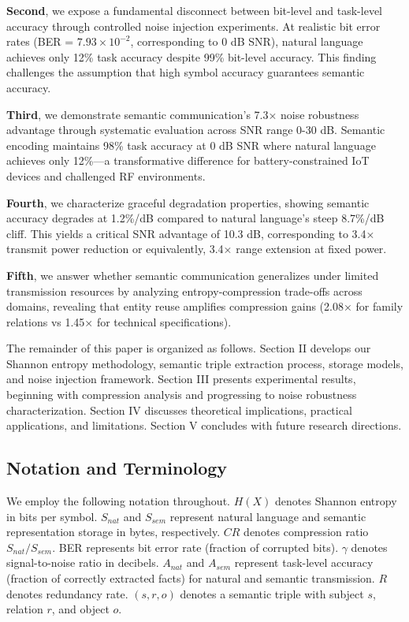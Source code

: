 \documentclass[conference]{IEEEtran}
\begin{document}
\textbf{Second}, we expose a fundamental disconnect between bit-level 
and task-level accuracy through controlled noise injection experiments. 
At realistic bit error rates (BER = $7.93 \times 10^{-2}$, corresponding 
to 0 dB SNR), natural language achieves only 12\% task accuracy despite 
99\% bit-level accuracy. This finding challenges the assumption that 
high symbol accuracy guarantees semantic accuracy.

\textbf{Third}, we demonstrate semantic communication's 7.3× noise 
robustness advantage through systematic evaluation across SNR range 
0-30 dB. Semantic encoding maintains 98\% task accuracy at 0 dB SNR 
where natural language achieves only 12\%—a transformative difference 
for battery-constrained IoT devices and challenged RF environments.

\textbf{Fourth}, we characterize graceful degradation properties, showing 
semantic accuracy degrades at 1.2\%/dB compared to natural language's 
steep 8.7\%/dB cliff. This yields a critical SNR advantage of 10.3 dB, 
corresponding to 3.4× transmit power reduction or equivalently, 3.4× 
range extension at fixed power.

\textbf{Fifth}, we answer whether semantic communication generalizes 
under limited transmission resources by analyzing entropy-compression 
trade-offs across domains, revealing that entity reuse amplifies compression 
gains (2.08× for family relations vs 1.45× for technical specifications).

The remainder of this paper is organized as follows. Section II develops 
our Shannon entropy methodology, semantic triple extraction process, 
storage models, and noise injection framework. Section III presents 
experimental results, beginning with compression analysis and progressing 
to noise robustness characterization. Section IV discusses theoretical 
implications, practical applications, and limitations. Section V concludes 
with future research directions.

\subsection{Notation and Terminology}

We employ the following notation throughout. $H(X)$ denotes Shannon 
entropy in bits per symbol. $S_{nat}$ and $S_{sem}$ represent natural 
language and semantic representation storage in bytes, respectively. 
$CR$ denotes compression ratio $S_{nat}/S_{sem}$. BER represents bit 
error rate (fraction of corrupted bits). $\gamma$ denotes signal-to-noise 
ratio in decibels. $A_{nat}$ and $A_{sem}$ represent task-level accuracy 
(fraction of correctly extracted facts) for natural and semantic transmission. 
$R$ denotes redundancy rate. $(s, r, o)$ denotes a semantic triple with 
subject $s$, relation $r$, and object $o$.
\end{document}
